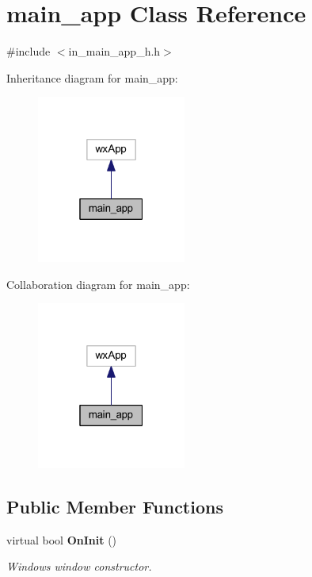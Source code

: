 \section{main\+\_\+app Class Reference}
\label{classmain__app}


{\ttfamily \#include $<$in\+\_\+main\+\_\+app\+\_\+h.\+h$>$}



Inheritance diagram for main\+\_\+app\+:
\nopagebreak
\begin{figure}[H]
\begin{center}
\leavevmode
\includegraphics[width=139pt]{classmain__app__inherit__graph}
\end{center}
\end{figure}


Collaboration diagram for main\+\_\+app\+:
\nopagebreak
\begin{figure}[H]
\begin{center}
\leavevmode
\includegraphics[width=139pt]{classmain__app__coll__graph}
\end{center}
\end{figure}
\subsection*{Public Member Functions}
\begin{DoxyCompactItemize}
\item 
virtual bool \textbf{ On\+Init} ()
\begin{DoxyCompactList}\small\item\em Windows window constructor. \end{DoxyCompactList}\end{DoxyCompactItemize}


